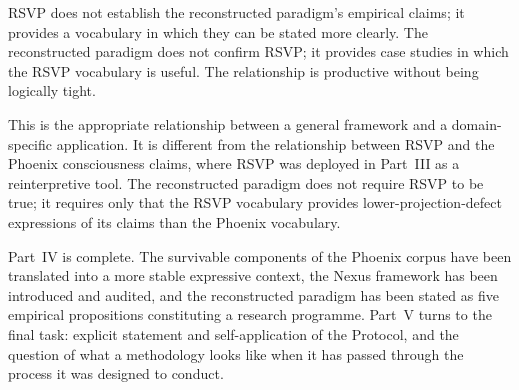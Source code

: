 RSVP does not establish the reconstructed paradigm's
empirical claims; it provides a vocabulary in which
they can be stated more clearly. The reconstructed
paradigm does not confirm RSVP; it provides case
studies in which the RSVP vocabulary is useful.
The relationship is productive without being logically
tight.

This is the appropriate relationship between a general
framework and a domain-specific application. It is
different from the relationship between RSVP and
the Phoenix consciousness claims, where RSVP was
deployed in Part~III as a reinterpretive tool. The
reconstructed paradigm does not require RSVP to be
true; it requires only that the RSVP vocabulary
provides lower-projection-defect expressions of its
claims than the Phoenix vocabulary.

\medskip

Part~IV is complete. The survivable components of
the Phoenix corpus have been translated into a more
stable expressive context, the Nexus framework has
been introduced and audited, and the reconstructed
paradigm has been stated as five empirical propositions
constituting a research programme. Part~V turns to
the final task: explicit statement and self-application
of the \Ortyx{} Protocol, and the question of what
a methodology looks like when it has passed through
the process it was designed to conduct.
